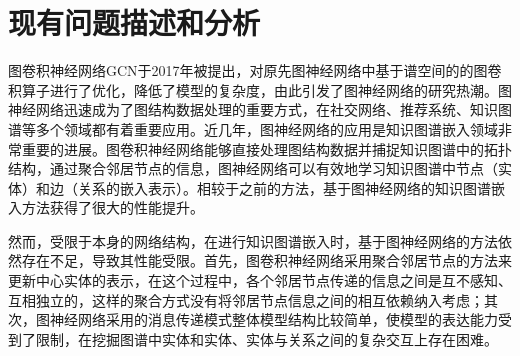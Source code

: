 





\section{现有问题描述和分析}

图卷积神经网络GCN于2017年被提出，对原先图神经网络中基于谱空间的的图卷积算子进行了优化，降低了模型的复杂度，由此引发了图神经网络的研究热潮。图神经网络迅速成为了图结构数据处理的重要方式，在社交网络、推荐系统、知识图谱等多个领域都有着重要应用。近几年，图神经网络的应用是知识图谱嵌入领域非常重要的进展。图卷积神经网络能够直接处理图结构数据并捕捉知识图谱中的拓扑结构，通过聚合邻居节点的信息，图神经网络可以有效地学习知识图谱中节点（实体）和边（关系的嵌入表示）。相较于之前的方法，基于图神经网络的知识图谱嵌入方法获得了很大的性能提升。

然而，受限于本身的网络结构，在进行知识图谱嵌入时，基于图神经网络的方法依然存在不足，导致其性能受限。首先，图卷积神经网络采用聚合邻居节点的方法来更新中心实体的表示，在这个过程中，各个邻居节点传递的信息之间是互不感知、互相独立的，这样的聚合方式没有将邻居节点信息之间的相互依赖纳入考虑；其次，图神经网络采用的消息传递模式整体模型结构比较简单，使模型的表达能力受到了限制，在挖掘图谱中实体和实体、实体与关系之间的复杂交互上存在困难。

